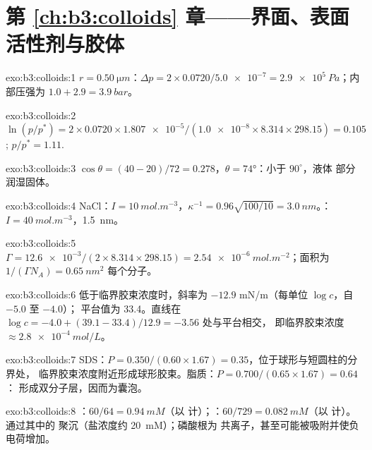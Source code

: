\section*{第 \ref{ch:b3:colloids} 章——界面、表面活性剂与胶体}

\begin{solution}{exo:b3:colloids:1}
$r = \qty{0.50}{\micro m}$：$\Delta p = 2 \times 0.0720/\num{5.0e-7} = \qty{2.9e5}{Pa}$；内部压强为 $1.0 + 2.9 = \qty{3.9}{bar}$。
\end{solution}

\begin{solution}{exo:b3:colloids:2}
$\ln(p/p^*) = 2 \times 0.0720 \times \num{1.807e-5}/(\num{1.0e-8} \times 8.314 \times 298.15) = 0.105$; $p/p^* = 1.11$.
\end{solution}

\begin{solution}{exo:b3:colloids:3}
$\cos\theta = (40 - 20)/72 = 0.278$，$\theta = \ang{74}$：小于 $90^\circ$，液体
部分润湿固体。
\end{solution}

\begin{solution}{exo:b3:colloids:4}
NaCl：$I = \qty{10}{mol.m^{-3}}$，$\kappa^{-1} = 0.96\sqrt{100/10} = \qty{3.0}{nm}$。：$I = \qty{40}{mol.m^{-3}}$，\qty{1.5}{nm}。
\end{solution}

\begin{solution}{exo:b3:colloids:5}
$\Gamma = \num{12.6e-3}/(2 \times 8.314 \times 298.15) = \qty{2.54e-6}{mol.m^{-2}}$；面积为 $1/(\Gamma N_A) =
\qty{0.65}{nm^2}$ 每个分子。
\end{solution}

\begin{solution}{exo:b3:colloids:6}
低于临界胶束浓度时，斜率为 $-12.9$ \unit{mN/m}（每单位 $\log c$，自 $-5.0$ 至 $-4.0$）；
平台值为 33.4。直线在 $\log c = -4.0 + (39.1 - 33.4)/12.9 = -3.56$ 处与平台相交，
即临界胶束浓度 $\approx \qty{2.8e-4}{mol/L}$。
\end{solution}

\begin{solution}{exo:b3:colloids:7}
SDS：$P = 0.350/(0.60 \times 1.67) = 0.35$，位于球形与短圆柱的分界处，
临界胶束浓度附近形成球形胶束。脂质：$P = 0.700/(0.65 \times 1.67) = 0.64$：
形成双分子层，因而为囊泡。
\end{solution}

\begin{solution}{exo:b3:colloids:8}
：$60/64 = \qty{0.94}{mM}$（以  计）；：$60/729 = \qty{0.082}{mM}$（以  计）。
通过其中的  聚沉（盐浓度约 \qty{20}{mM}）；磷酸根为
共离子，甚至可能被吸附并使负电荷增加。
\end{solution}

